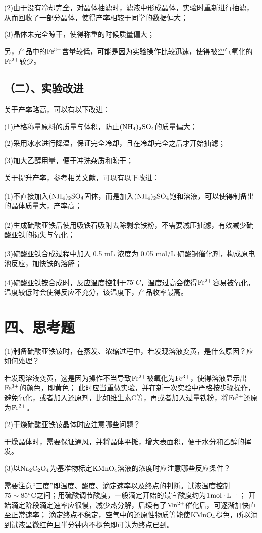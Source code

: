 \documentclass[a4paper,12pt]{article}
\begin{document}
(2)由于没有冷却完全，对晶体抽滤时，滤液中形成晶体，实验时重新进行抽滤，从而回收了一部分晶体，使得产率相较于同学的数据偏大；

(3)晶体未完全晾干，使得称重的时候质量偏大；

另，产品中的$\rm Fe^{3+}$含量较低，可能是因为实验操作比较迅速，使得被空气氧化的$\rm Fe^{2+}$较少。

\subsection*{（二）、实验改进}

关于产率略高，可以有以下改进：

(1)严格称量原料的质量与体积，防止$\rm (NH_4)_2SO_4$的质量偏大；

(2)采用冰水进行降温，保证完全冷却，且在冷却完全之后才开始抽滤；

(3)加大乙醇用量，便于冲洗杂质和晾干；

关于提升产率，参考相关文献，可以有以下改进：

(1)不直接加入$\rm (NH_4)_2SO_4$固体，而是加入$\rm (NH_4)_2SO_4$饱和溶液\textsuperscript{\cite{GZHA202401061}}，可以使得制备出的晶体质量大，产率高；

(2)生成硫酸亚铁后使用吸铁石吸附去除剩余铁粉，不需要减压抽滤\textsuperscript{\cite{GLKX202311020}}，有效减少硫酸亚铁的损失与氧化；

(3)硫酸亚铁合成过程中加入 0.5 mL 浓度为 0.05 mol/L 硫酸铜催化剂\textsuperscript{\cite{GLKX202311020}}，构成原电池反应，加快铁的溶解；

(4)硫酸亚铁铵合成时，反应温度控制于$75^{\circ} C$\textsuperscript{\cite{GLKX202311020}}，温度过高会使得$\rm Fe^{2+}$容易被氧化，温度较低时会使得反应不充分，该温度下，产品收率最高。

\section*{四、思考题}

(1)制备硫酸亚铁铵时，在蒸发、浓缩过程中，若发现溶液变黄，是什么原因？应如何处理？

若发现溶液变黄，这是因为操作不当导致$\rm Fe^{2+}$被氧化为$\rm Fe^{3+}$，使得溶液显示出$\rm Fe^{3+}$的颜色，即黄色；
此时应当重做实验，并在新一次实验中严格按步骤操作，避免氧化，或者加入还原剂，比如维生素C等，再或者加入过量铁粉，将$\rm Fe^{3+}$还原为$\rm Fe^{2+}$。

(2)干燥硫酸亚铁铵晶体时应注意哪些问题？

干燥晶体时，需要保证通风，并将晶体平摊，增大表面积，便于水分和乙醇的挥发。

(3)以$\rm Na_2C_2O_4$为基准物标定$\rm KMnO_4$溶液的浓度时应注意哪些反应条件？

需要注意“三度”即温度、酸度、滴定速率以及终点的判断。试液温度控制$\rm 75\sim 85^{\circ}C$之间；用硫酸调节酸度，一般滴定开始的最宜酸度约为$\rm 1mol\cdot L^{-1}$；
开始滴定阶段滴定速率应很慢，减少热分解，后续有了$\rm Mn^{2+}$催化后，可逐渐加快直至正常速率；
滴定终点不稳定，空气中的还原性物质等能使$\rm KMnO_4$褪色，所以滴到试液呈微红色且半分钟内不褪色即可认为终点已到。



\end{document}
